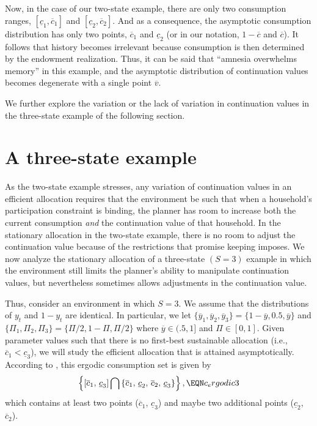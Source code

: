 Now, in the case of our two-state example, there are only two
consumption ranges, $[\underline c_1, \overline c_1]$ and
$[\underline c_2, \overline c_2]$. And as a consequence, the
asymptotic consumption distribution has only two points,
$\overline c_1$ and $\underline c_2$ (or in our notation,
$1-\overline c$ and $\overline c$). It follows that history
becomes  irrelevant because consumption is then determined by the
endowment realization. Thus, it can be said that ``amnesia
overwhelms memory'' in this example, and the asymptotic
distribution of continuation values becomes degenerate with a
single point $\overline v$.

We further explore the variation or the lack of variation
in continuation values in the three-state example of the following
section.




\section{A three-state example}\label{sec:3state}%
As the two-state example stresses, any variation of continuation values
in an efficient allocation requires that
 the environment be such that when a household's participation constraint
is binding, the planner has room to increase both the current
consumption {\it and\/} the continuation value of that household.
In the stationary allocation in the two-state example, there is no
room to adjust the continuation value because of the restrictions
that promise keeping imposes. We now analyze the stationary
allocation of a three-state $(S=3)$ example in which
the environment still limits the planner's ability to manipulate
continuation values, but nevertheless sometimes allows adjustments
in the continuation value.

Thus, consider an environment in which $S=3$. We assume
that the distributions of $y_t$ and $1-y_t$ are identical.  In particular,
we let $\{\overline y_1,\overline y_2,\overline y_3\}=
\{1-\overline y, 0.5, \overline y\}$ and
$\{\Pi_1, \Pi_2, \Pi_3\}=\{\Pi/2, 1-\Pi, \Pi/2\}$ where
$\overline y\in(.5, 1]$ and $\Pi\in[0,1]$.
Given parameter values such that there is no first-best
sustainable allocation
(i.e., $\overline c_1 < \underline c_3$),
we will study the efficient allocation that is attained
asymptotically. According to , this ergodic
consumption set is given by
$$
\left\{\left[\overline c_1,\, \underline c_3\right]
\bigcap \, \{\overline c_1,\, \underline c_2,\, \overline c_2,
           \, \underline c_3\} \right\}, \EQN c_ergodic3
$$
which contains at least two points ($\overline c_1$, $\underline c_3$)
and maybe two additional points ($\underline c_2$, $\overline c_2$).

